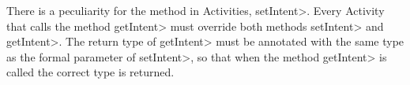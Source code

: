There is a peculiarity for the \onReceive{} method in Activities, \<setIntent>.
Every Activity that calls the method \<getIntent> must override both methods
\<setIntent> and \<getIntent>. The return type of \<getIntent> must be annotated
with the same type as the formal parameter of \<setIntent>, so that when the
method \<getIntent> is called the correct type is returned.

